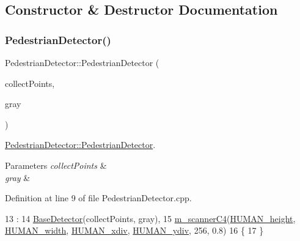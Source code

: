 \subsection{Constructor \& Destructor Documentation}
\mbox{\label{class_pedestrian_detector_afdf81621958b3bd7083a67c76a535e4a}} 
\subsubsection{\texorpdfstring{Pedestrian\+Detector()}{PedestrianDetector()}}
{\footnotesize\ttfamily Pedestrian\+Detector\+::\+Pedestrian\+Detector (\begin{DoxyParamCaption}\item[{bool}]{collect\+Points,  }\item[{cv\+::\+U\+Mat \&}]{gray }\end{DoxyParamCaption})}



\mbox{\hyperlink{class_pedestrian_detector_afdf81621958b3bd7083a67c76a535e4a}{Pedestrian\+Detector\+::\+Pedestrian\+Detector}}. 


\begin{DoxyParams}{Parameters}
{\em collect\+Points} & \\
\hline
{\em gray} & \\
\hline
\end{DoxyParams}


Definition at line 9 of file Pedestrian\+Detector.\+cpp.


\begin{DoxyCode}
13     :
14       \mbox{\hyperlink{class_base_detector_a3c85e13a47dd472319dc43c60f0d102a}{BaseDetector}}(collectPoints, gray),
15       \mbox{\hyperlink{class_pedestrian_detector_a68a45a369623a3492065bdf29e81b29c}{m\_scannerC4}}(\mbox{\hyperlink{class_pedestrian_detector_a600b0da8ac472bcd8cb8aeb0e9f87eb7}{HUMAN\_height}}, \mbox{\hyperlink{class_pedestrian_detector_afa7733c965e2d44d6908309b33201d90}{HUMAN\_width}}, 
      \mbox{\hyperlink{class_pedestrian_detector_acdc72a22ba921457147c613ac874b3ed}{HUMAN\_xdiv}}, \mbox{\hyperlink{class_pedestrian_detector_ab2626952044b310482883b506023e6a7}{HUMAN\_ydiv}}, 256, 0.8)
16 \{
17 \}
\end{DoxyCode}
\mbox{\label{class_pedestrian_detector_af093451952c64eb107ac2e2aff115b6c}} 
